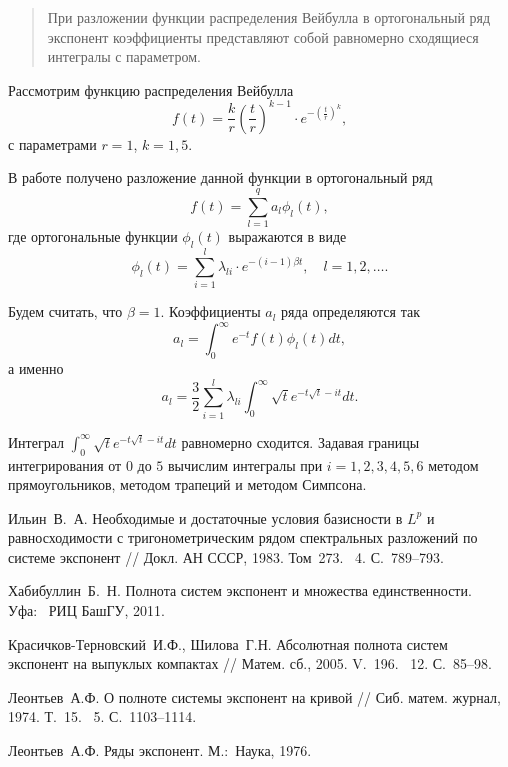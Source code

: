 \maketitle

\begin{abstract}
При разложении функции распределения Вейбулла в ортогональный ряд экспонент коэффициенты представляют собой равномерно сходящиеся интегралы с параметром.

\end{abstract}


Рассмотрим функцию распределения Вейбулла
$$
f(t)=\frac{k}{r}\left(\frac{t}{r}\right)^{k-1}\cdot e^{-\left(\frac{t}{r}\right)^k},
$$
с параметрами $r=1$, $k=1,5$.


В работе получено разложение данной функции в ортогональный ряд
$$
f(t)=\sum_{l=1}^q a_l\phi_l(t),
$$ 
где ортогональные функции $\phi_l(t)$ выражаются в виде
$$
\phi_l(t)=\sum_{i=1}^l\lambda_{li}\cdot e^{-(i-1)\beta t},\quad l=1,2,\ldots.
$$ 

Будем считать, что $\beta=1$.
Коэффициенты $a_l$ ряда определяются так
$$
a_l=\int_0^{\infty}e^{-t}f(t)\phi_l(t)dt,
$$
а именно
$$
a_l=\frac{3}{2}\sum_{i=1}^l\lambda_{li}\int_0^{\infty}\sqrt{t}e^{-t\sqrt{t}-it}dt.
$$

Интеграл $\int_0^{\infty}\sqrt{t}e^{-t\sqrt{t}-it}dt$ равномерно сходится. Задавая границы интегрирования от $0$ до $5$ вычислим интегралы при $i=1,2,3,4,5,6$ методом прямоугольников, методом трапеций и методом Симпсона.
%

\begin{thebibliography}{9} %
 Ильин~В.~А. Необходимые и достаточные условия базисности в $L^p$ и равносходимости с тригонометрическим рядом спектральных разложений по системе экспонент // Докл. АН СССР, 1983. Том~273. \textnumero~4. С.~789--793.

 Хабибуллин~Б.~Н. Полнота систем экспонент и множества единственности.  Уфа:~ РИЦ БашГУ, 2011.


	Красичков-Терновский~И.Ф., Шилова~Г.Н. Абсолютная полнота систем экспонент на выпуклых компактах // Матем. сб., 2005. V.~196. \textnumero~12. С.~85--98.

	Леонтьев~А.Ф. О полноте системы экспонент на кривой // Сиб. матем. журнал, 1974. Т.~15. \textnumero~5. С.~1103--1114.

	Леонтьев~А.Ф. Ряды экспонент. М.:~Наука, 1976.
\end{thebibliography}




%
